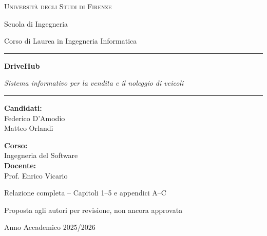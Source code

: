 \documentclass[12pt,a4paper]{report}
\begin{document}
\hypersetup{pageanchor=false}
\begin{titlepage}
  \centering
  {\Large\textsc{Università degli Studi di Firenze}\par}
  {\large Scuola di Ingegneria\par}
  {\large Corso di Laurea in Ingegneria Informatica\par}
  \vspace{2cm}
  \rule{\linewidth}{.5pt}\par\vspace{.8cm}
  {\Huge\bfseries\color{blue!55!black} DriveHub\par}\vspace{.35cm}
  {\Large\itshape Sistema informativo per la vendita e il noleggio di veicoli\par}
  \vspace{.8cm}\rule{\linewidth}{.5pt}\par
  \vspace{1.7cm}
  \begin{minipage}[t]{.48\linewidth}\raggedright
    \textbf{Candidati:}\\[.3cm]
    Federico D'Amodio\\
    Matteo Orlandi
  \end{minipage}\hfill
  \begin{minipage}[t]{.48\linewidth}\raggedleft
    \textbf{Corso:}\\
    Ingegneria del Software\\[.35cm]
    \textbf{Docente:}\\
    Prof. Enrico Vicario
  \end{minipage}
  \vfill
  {\small Relazione completa -- Capitoli 1--5 e appendici A--C\par
  Proposta agli autori per revisione, non ancora approvata\par}
  \vspace{.4cm}
  {\large Anno Accademico 2025/2026\par}
\end{titlepage}
\hypersetup{pageanchor=true}
\tableofcontents
\clearpage
{}





\appendix

\end{document}
